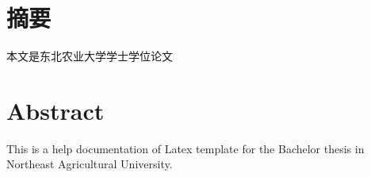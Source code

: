 \chapter{摘\quad 要}%
\linespread{1.5}

本文是东北农业大学学士学位论文

\chapter{Abstract}%

This is a help documentation of Latex template for the Bachelor thesis in Northeast Agricultural University.

